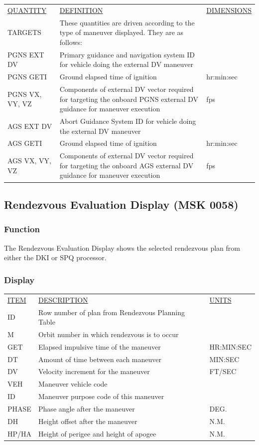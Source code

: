 \documentclass[11pt]{article} %
\begin{document}
\begin{center}
\begin{tabular}{ L{2.4cm} L{7.1cm} L{3cm} }
\end{tabular}
\newpage
\begin{tabular}{ L{2.4cm} L{7.1cm} L{3cm} }
\underline{QUANTITY} & \underline{DEFINITION} & \underline{DIMENSIONS} \\
TARGETS&These quantities are driven according to the type of maneuver displayed. They are as follows:\\
PGNS EXT DV&Primary guidance and navigation system ID for vehicle doing the external DV maneuver\\
PGNS GETI&Ground elapsed time of ignition&hr:min:sec\\
PGNS VX, VY, VZ&Components of external DV vector required for targeting the onboard PGNS external DV guidance for maneuver execution&fps\\
AGS EXT DV&Abort Guidance System ID for vehicle doing the external DV maneuver\\
AGS GETI&Ground elapsed time of ignition&hr:min:sec\\
AGS VX, VY, VZ&Components of external DV vector required for targeting the onboard AGS external DV guidance for maneuver execution&fps\\
\end{tabular}
\end{center}
\newpage
\subsection{Rendezvous Evaluation Display (MSK 0058)} \label{RED}
\subsubsection{Function}
The Rendezvous Evaluation Display shows the selected rendezvous plan from either the DKI or SPQ processor.
\subsubsection{Display}
\begin{center}
\begin{tabular}{ L{2.8cm} L{8cm} L{3cm} }
\underline{ITEM} & \underline{DESCRIPTION} & \underline{UNITS} \\
ID&Row number of plan from Rendezvous Planning Table&\\
M&Orbit number in which rendezvous is to occur&\\
GET&Elapsed impulsive time of the maneuver&HR:MIN:SEC\\
DT&Amount of time between each maneuver&MIN:SEC\\
DV&Velocity increment for the maneuver&FT/SEC\\
VEH&Maneuver vehicle code&\\
ID&Maneuver purpose code of this maneuver&\\
PHASE&Phase angle after the maneuver&DEG.\\
DH&Height offset after the maneuver&N.M.\\
HP/HA&Height of perigee and height of apogee&N.M.\\
\end{tabular}
\end{center}
\newpage
\end{document}
